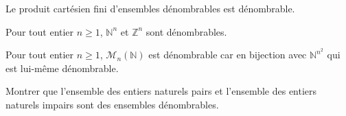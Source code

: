 \documentclass[a4paper,10pt]{report}
\begin{document}
$\phantom{test}$

\vspace{6cm}

\begin{Proposition}{} Le produit cartésien fini d'ensembles dénombrables est dénombrable.
\end{Proposition} 

\begin{Demonstration}{}

\vspace{6cm}
\end{Demonstration}



\begin{exems}
\item Pour tout entier $n \geq 1$, $\mathbb{N}^n$ et $\mathbb{Z}^n$ sont dénombrables.
\item Pour tout entier $n \geq 1$, $\mathcal{M}_n(\mathbb{N})$ est dénombrable car en bijection avec $\mathbb{N}^{n^2}$ qui est lui-même dénombrable.
\end{exems}

\begin{ApplicationDirecte} Montrer que l'ensemble des entiers naturels pairs et l'ensemble des entiers naturels impairs sont des ensembles dénombrables.
\end{ApplicationDirecte}
\end{document}
